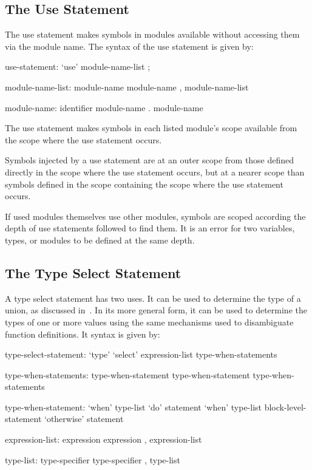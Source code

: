 \subsection{The Use Statement}
\label{The_Use_Statement}

The use statement makes symbols in modules available without accessing
them via the module name.  The syntax of the use statement is given
by:
\begin{syntax}
use-statement:
  `use' module-name-list ;

module-name-list:
  module-name
  module-name , module-name-list

module-name:
  identifier
  module-name . module-name
\end{syntax}
The use statement makes symbols in each listed module's scope available
from the scope where the use statement occurs.

Symbols injected by a use statement are at an outer scope from those
defined directly in the scope where the use statement occurs, but at a
nearer scope than symbols defined in the scope containing the scope where
the use statement occurs.

If used modules themselves use other modules, symbols are scoped according
the depth of use statements followed to find them. It is an error for two
variables, types, or modules to be defined at the same depth.

\subsection{The Type Select Statement}
\label{The_Type_Select_Statement}


A type select statement has two uses.  It can be used to determine the
type of a union, as discussed
in~.  In its more general
form, it can be used to determine the types of one or more values
using the same mechanisms used to disambiguate function definitions.
It syntax is given by:
\begin{syntax}
type-select-statement:
  `type' `select' expression-list { type-when-statements }

type-when-statements:
  type-when-statement
  type-when-statement type-when-statements

type-when-statement:
  `when' type-list `do' statement
  `when' type-list block-level-statement
  `otherwise' statement

expression-list:
  expression
  expression , expression-list

type-list:
  type-specifier
  type-specifier , type-list
\end{syntax}


